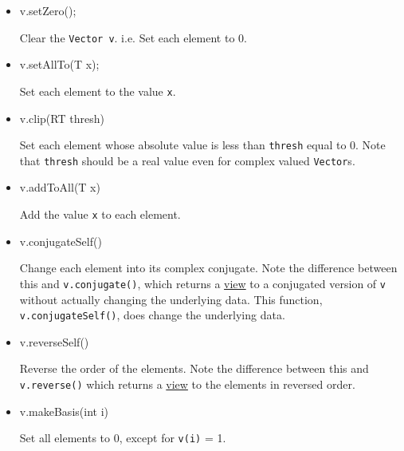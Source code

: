 \documentclass[twoside,letterpaper,11pt]{article}
\renewcommand{\tt}[1]{{\lstinline {#1}}}
\begin{document}
\begin{itemize}

\item
\begin{tmvcode}
v.setZero();
\end{tmvcode}
Clear the \tt{Vector v}.  i.e. Set each element to 0.

\item
\begin{tmvcode}
v.setAllTo(T x);
\end{tmvcode}
Set each element to the value \tt{x}.

\item
\begin{tmvcode}
v.clip(RT thresh)
\end{tmvcode}
Set each element whose absolute value is less than \tt{thresh} equal to 0.
Note that \tt{thresh} should be a real value even for complex valued
\tt{Vector}s.

\item
\begin{tmvcode}
v.addToAll(T x)
\end{tmvcode}
Add the value \tt{x} to each element.

\item 
\begin{tmvcode}
v.conjugateSelf()
\end{tmvcode}
Change each element into its complex conjugate.  
Note the difference between this and \tt{v.conjugate()}, 
which returns a \underline{view} to a conjugated version of \tt{v} without
actually changing the underlying data.  This function, \tt{v.conjugateSelf()},
does change the underlying data.

\item
\begin{tmvcode}
v.reverseSelf()
\end{tmvcode}
Reverse the order of the elements.  Note the difference between this and 
\tt{v.reverse()} which returns a \underline{view} to the elements in 
reversed order.

\item
\begin{tmvcode}
v.makeBasis(int i)
\end{tmvcode}
Set all elements to 0, except for \tt{v(i)} = 1.


\end{itemize}
\end{document}
